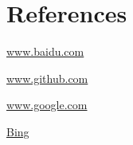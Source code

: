 \chapter{References}

\url{www.baidu.com}

\url{www.github.com}

\url{www.google.com}

\href{www.bing.com}{Bing}
